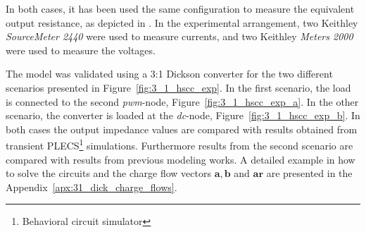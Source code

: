 


In both cases, it has been used the same configuration to measure the equivalent output resistance, as depicted in . In the experimental arrangement, two Keithley\textsuperscript{\textregistered} \emph{SourceMeter 2440} were used to measure currents, and two Keithley\textsuperscript{\textregistered} \emph{Meters 2000} were used to measure the voltages.

%



The model was validated using a 3:1 Dickson converter for the two different scenarios presented in Figure~\ref{fig:3_1_hscc_exp}. In the first scenario, the load is connected to the second \emph{pwm}-node, Figure~\ref{fig:3_1_hscc_exp_a}. In the other scenario, the converter is loaded at the \emph{dc}-node, Figure~\ref{fig:3_1_hscc_exp_b}. In both cases the output impedance values are compared with results obtained from transient PLECS\footnote{\label{fn:PLECS}Behavioral circuit simulator} simulations. Furthermore results from the second scenario are compared with results from previous modeling works.  A detailed example in how to solve the circuits and the charge flow vectors $\mathbf{a}, \mathbf{b} $ and $\mathbf{ar}$ are presented in the Appendix~\ref{apx:31_dick_charge_flows}.


%

